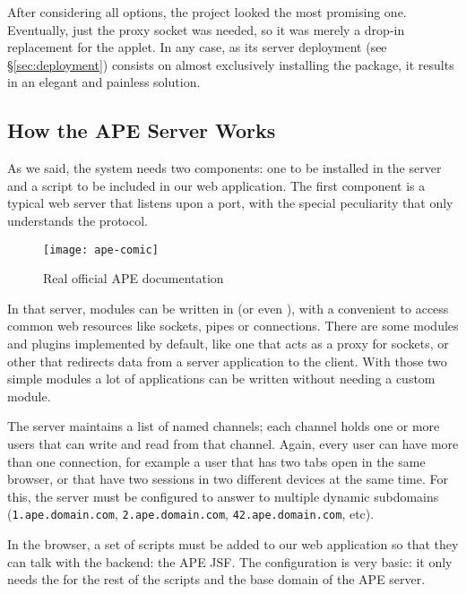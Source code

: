 After considering all options, the  project looked the most promising one.
Eventually, just the proxy socket was needed, so it was merely a drop-in replacement for the  applet.
In any case, as its server deployment (see \S\ref{sec:deployment}) consists on almost exclusively installing the   package, it results in an elegant and painless solution.


\subsection{How the APE Server Works} %
\label{sub:how_the_ape_server_works}

As we said, the system needs two components: one to be installed in the server and a script to be included in our web application.
The first component is a typical web server that listens upon a port, with the special peculiarity that only understands the  protocol.

\begin{wrapfigure}{r}{0.5\textwidth}
  \centering
    \texttt{[image: ape-comic]}
  \caption{Real official APE documentation}
  \label{fig:ape-comic}
\end{wrapfigure}

In that server, modules can be written in  (or even ), with a convenient  to access common web resources like sockets, pipes or  connections.
There are some modules and plugins implemented by default, like one that acts as a proxy for  sockets, or other that redirects data from a server application to the client.
With those two simple modules a lot of applications can be written without needing a custom module.

The server maintains a list of named channels; each channel holds one or more users that can write and read from that channel.
Again, every user can have more than one connection, for example a user that has two tabs open in the same browser, or that have two sessions in two different devices at the same time.
For this, the server  must be configured to answer to multiple dynamic subdomains  (\verb|1.ape.domain.com|, \verb|2.ape.domain.com|, \verb|42.ape.domain.com|, etc).

In the browser, a set of scripts must be added to our web application so that they can talk with the backend: the \ac{APE} \ac{JSF}.
The configuration is very basic: it only needs the  for the rest of the scripts and the base domain of the \ac{APE} server.

